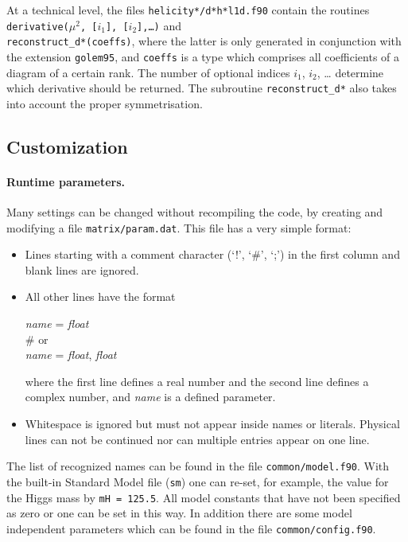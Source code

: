 \documentclass[11pt,a4paper]{refrep}
\begin{document}
At a technical level, 
the files \texttt{helicity*/d*h*l1d.f90} contain the routines
\texttt{derivative($\mu^2$, [$i_1$], [$i_2$],\dots)} and\\
\texttt{reconstruct\_d*(coeffs)}, where the latter is only generated in
conjunction with the extension \texttt{golem95}, and \texttt{coeffs} is
a type which comprises all coefficients of a diagram of a certain rank.
The number of optional indices $i_1$, $i_2$, \dots 
determine which derivative should be returned. The subroutine
\texttt{reconstruct\_d*} also takes into account the proper symmetrisation.

\subsection{Customization}
\paragraph{Runtime parameters.}
Many settings can be changed without recompiling the code, by
creating and modifying a file \texttt{matrix/param.dat}.
This file has a very simple format:
\begin{itemize}
\item Lines starting with a comment character (`!', `\#', `;')
      in the first column and blank lines are ignored.
\item All other lines have the format
\begin{example}
\textit{name} = \textit{float}\\
\# \textrm{or}\\
\textit{name} = \textit{float}, \textit{float}
\end{example}
      where the first line defines a real number and the second
      line defines a complex number, and \textit{name} is a defined
      parameter.
\item Whitespace is ignored but must not appear inside names or
      literals. Physical lines can not be continued nor can
      multiple entries appear on one line.
\end{itemize}
The list of recognized names can be found in the file
\texttt{common/model.f90}. 
With the built-in Standard Model file (\texttt{sm}) one
can re-set, for example, the value for the Higgs mass by 
{\tt mH = 125.5}.
All model constants that have not been specified as zero or one
can be set in this way. 
In addition there are some model independent parameters which can be found in the file 
\texttt{common/config.f90}.
\end{document}
